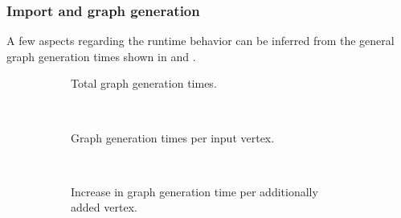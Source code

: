 		\subsubsection{Import and graph generation}
		
			A few aspects regarding the runtime behavior can be inferred from the general graph generation times shown in  and .
			
			\begin{figure}[h!]
				\begin{minipage}{.48\textwidth}
					\begin{subfigure}[t]{\linewidth}
						\begin{figcenter}
							
						\end{figcenter}
						\caption{Total graph generation times.}
						\label{fig:eval-import-city-abs}
					\end{subfigure}
					\\[3ex]
					\begin{subfigure}[t]{\linewidth}
						\begin{figcenter}
							
						\end{figcenter}
						\caption{Graph generation times per input vertex.}
					\end{subfigure}
					\\[3ex]
					\begin{subfigure}[t]{\linewidth}
						\begin{figcenter}
							
						\end{figcenter}
						\caption{Increase in graph generation time per additionally added vertex.}
						\label{fig:eval-import-city-rel-increase}
					\end{subfigure}
					\caption{Graph generation times using the \enquote{OSM city} dataset.}
					\label{fig:eval-import-city}
				\end{minipage}
				\hfill
				\begin{minipage}{.48\textwidth}
					\begin{subfigure}[t]{\linewidth}
						\begin{figcenter}
							
						\end{figcenter}

\end{subfigure}
\end{minipage}
\end{figure}
